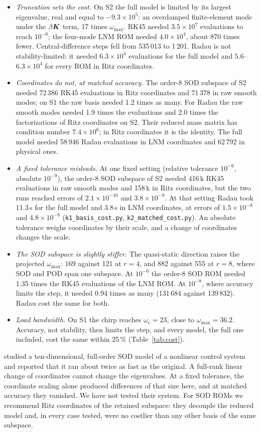 \documentclass[preprint,12pt]{elsarticle}
\begin{document}
\begin{itemize}
\item \emph{Truncation sets the cost.} On S2 the full model is limited by its largest eigenvalue, real and equal to $-9.3\times10^5$: an overdamped finite-element mode under the $\beta\bm{K}$ term, 17 times $\omega_{\max}$. RK45 needed $3.5\times10^7$ evaluations to reach $10^{-6}$; the four-mode LNM ROM needed $4.0\times10^4$, about 870 times fewer. Central-difference steps fell from 535\,013 to 1\,201. Radau is not stability-limited: it needed $6.3\times10^4$ evaluations for the full model and $5.6$--$6.3\times10^4$ for every ROM in Ritz coordinates.
\item \emph{Coordinates do not, at matched accuracy.} The order-8 SOD subspace of S2 needed 72\,386 RK45 evaluations in Ritz coordinates and 71\,378 in raw smooth modes; on S1 the raw basis needed 1.2 times as many. For Radau the raw smooth modes needed 1.9 times the evaluations and 2.0 times the factorizations of Ritz coordinates on S2. Their reduced mass matrix has condition number $7.4\times10^6$; in Ritz coordinates it is the identity. The full model needed 58\,946 Radau evaluations in LNM coordinates and 62\,792 in physical ones.
\item \emph{A fixed tolerance misleads.} At one fixed setting (relative tolerance $10^{-6}$, absolute $10^{-9}$), the order-8 SOD subspace of S2 needed 416\,k RK45 evaluations in raw smooth modes and 158\,k in Ritz coordinates, but the two runs reached errors of $2.1\times10^{-10}$ and $3.8\times10^{-9}$. At that setting Radau took 11.3\,s for the full model and 3.8\,s in LNM coordinates, at errors of $1.5\times10^{-8}$ and $4.8\times10^{-8}$ (\texttt{k1\_basis\_cost.py}, \texttt{k2\_matched\_cost.py}). An absolute tolerance weighs coordinates by their scale, and a change of coordinates changes the scale.
\item \emph{The SOD subspace is slightly stiffer.} The quasi-static direction raises the projected $\omega_{\max}$: 169 against 121 at $r=4$, and 882 against 555 at $r=8$, where SOD and POD span one subspace. At $10^{-6}$ the order-8 SOD ROM needed 1.35 times the RK45 evaluations of the LNM ROM. At $10^{-8}$, where accuracy limits the step, it needed 0.94 times as many (131\,684 against 139\,832). Radau cost the same for both.
\item \emph{Load bandwidth.} On S1 the chirp reaches $\omega_{\mathrm c}=23$, close to $\omega_{\max}=36.2$. Accuracy, not stability, then limits the step, and every model, the full one included, cost the same within 25\,\% (Table~\ref{tab:cost}).
\end{itemize}
\citet{Ilbeigi2018} studied a ten-dimensional, full-order SOD model of a nonlinear control system and reported that it ran about twice as fast as the original. A full-rank linear change of coordinates cannot change the eigenvalues. At a fixed tolerance, the coordinate scaling alone produced differences of that size here, and at matched accuracy they vanished. We have not tested their system.
For SOD ROMs we recommend Ritz coordinates of the retained subspace: they decouple the reduced model and, in every case tested, were no costlier than any other basis of the same subspace.
\end{document}
